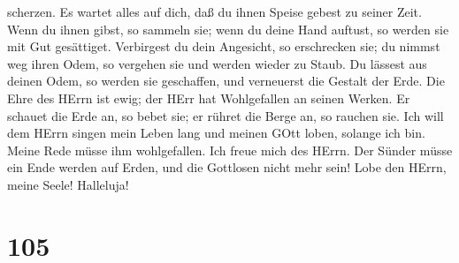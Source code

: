 scherzen.  Es wartet alles auf dich, daß du ihnen Speise
gebest zu seiner Zeit.  Wenn du ihnen gibst, so sammeln
sie; wenn du deine Hand auftust, so werden sie mit Gut gesättiget.
 Verbirgest du dein Angesicht, so erschrecken sie; du
nimmst weg ihren Odem, so vergehen sie und werden wieder zu Staub.
 Du lässest aus deinen Odem, so werden sie geschaffen, und
verneuerst die Gestalt der Erde.  Die Ehre des HErrn ist
ewig; der HErr hat Wohlgefallen an seinen Werken.  Er
schauet die Erde an, so bebet sie; er rühret die Berge an, so rauchen
sie.  Ich will dem HErrn singen mein Leben lang und meinen
GOtt loben, solange ich bin.  Meine Rede müsse ihm
wohlgefallen. Ich freue mich des HErrn.  Der Sünder müsse
ein Ende werden auf Erden, und die Gottlosen nicht mehr sein! Lobe den
HErrn, meine Seele! Halleluja!

\hypertarget{section-104}{%
\section{105}\label{section-104}}

